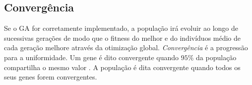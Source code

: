\subsection{Convergência}
Se o GA for corretamente implementado, a população irá evoluir ao longo de sucessivas gerações de modo que o fitness do melhor e do indivíduos médio de cada geração melhore através da otimização global. \textit{Convergência} é a progressão para a uniformidade. Um gene é dito convergente quando $95\%$ da população compartilha o mesmo valor \cite{DeJong1975}. A população é dita convergente quando todos os seus genes forem convergentes.
